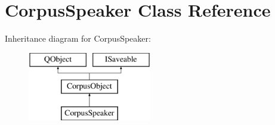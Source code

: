 \hypertarget{class_corpus_speaker}{}\section{Corpus\+Speaker Class Reference}
\label{class_corpus_speaker}
Inheritance diagram for Corpus\+Speaker\+:\begin{figure}[H]
\begin{center}
\leavevmode
\includegraphics[height=3.000000cm]{class_corpus_speaker}
\end{center}
\end{figure}
